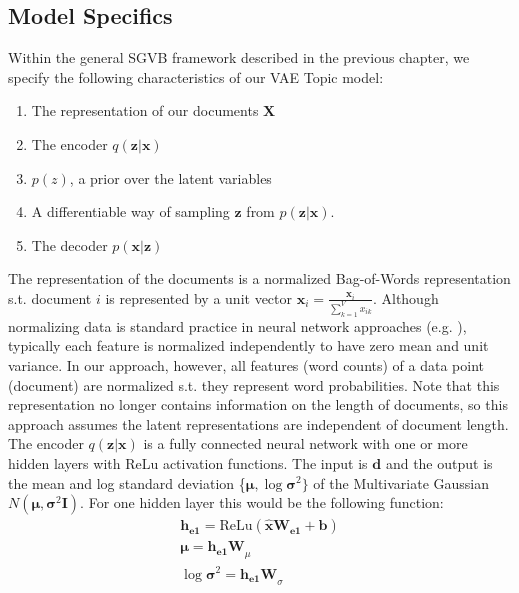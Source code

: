 \documentclass{report}
\begin{document}
\subsection{Model Specifics}

Within the general SGVB framework described in the previous chapter, we specify the following characteristics of our VAE Topic model:

\begin{enumerate}
	\item The representation of our documents $\mathbf{X}$
	\item The encoder $q(\mathbf{z}|\mathbf{x})$
	\item $p(z)$, a prior  over the latent variables
	\item A differentiable way of sampling $\mathbf{z}$ from $p(\mathbf{z}|\mathbf{x})$. 
	\item The decoder $p(\mathbf{x}|\mathbf{z})$
\end{enumerate}

The representation of the documents is a normalized Bag-of-Words representation s.t. document $i$ is represented by a unit vector $\hat{\mathbf{x}_i} = \frac{\mathbf{x}_i}{\sum_{k=1}^{V}x_{ik}}$. Although normalizing data is standard practice in neural network approaches (e.g. \cite{bishop1995neural}), typically each feature is normalized independently to have zero mean and unit variance. In our approach, however, all features (word counts) of a data point (document) are normalized s.t. they represent word probabilities.  Note that this representation no longer contains information on the length of documents, so this approach assumes the latent representations are independent of document length.
\\
The encoder $q(\mathbf{z}|\mathbf{x})$ is a fully connected neural network with one or more hidden layers with ReLu activation functions. The input is $\mathbf{d}$ and the output is the mean and log standard deviation \{$\boldsymbol{\mu}, \log \boldsymbol{\sigma} ^2\}$ of the Multivariate Gaussian $N(\boldsymbol{\mu}, \boldsymbol{\sigma} ^2\textbf{I})$. For one hidden layer this would be the following function:
\begin{align}
\mathbf{h_{e1}} = \text{ReLu}(\mathbf{\hat{x}}\mathbf{W_{e1}} + \mathbf{b}) \label{he1}\\
\boldsymbol{\mu} = \mathbf{h_{e1}W}_{\mu} \label{vae_encoding_mu} \\
\log \boldsymbol{\sigma}^2 = \mathbf{h_{e1}W}_{\sigma} \label{vae_encoding_sig}
\end{align} 
\end{document}
